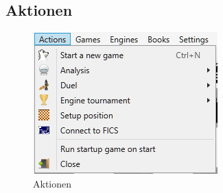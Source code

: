\documentclass[11pt,a4paper]{article}
\begin{document}
	\subsection{Aktionen}
	\begin{figure}[H]
		\centering
		\includegraphics[scale=1.0]{Actions.png}
		\caption{Aktionen}
		\label{fig:Actions}
	\end{figure}
\end{document}
